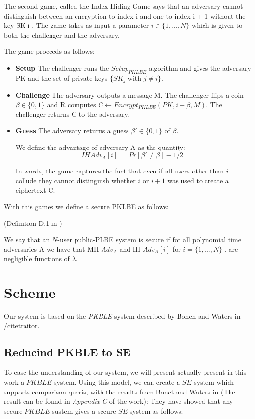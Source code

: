 \documentclass[a4paper, 12pt, oneside]{article}
\begin{document}
 The second game, called the Index Hiding Game says that an adversary cannot distinguish between an encryption to index i and one to index i + 1 without the key SK i . The game takes as input a parameter $i \in \{1, . . . , N\}$ which is given to both the challenger and the adversary.
 
The game proceeds as follows:
\begin{itemize}

\item \textbf{Setup} The challenger runs the $Setup_{PKLBE}$ algorithm and gives the adversary PK and the set of private keys $\{SK_j$ with $j \neq i\}$.


\item \textbf{Challenge} The adversary outputs a message M. The challenger flips a coin 
$\beta \in \{0, 1\}$ and R
computes $C \leftarrow Encrypt_{PKLBE}(PK, i + \beta, M)$. The challenger returns C to the adversary.

\item \textbf{Guess} The adversary returns a guess $\beta' \in \{0, 1\}$ of $\beta$.


We define the advantage of adversary A as the quantity:
\[IH Adv_A[i] = \vert Pr[\beta' \neq \beta] - 1/2 \vert\]

In words, the game captures the fact that even if all users other than $i$ collude they cannot distinguish whether $i$ or $i + 1$ was used to create a ciphertext C.

\end{itemize}
With this games we define a secure PKLBE as follows:

(Definition D.1 in \cite{bowa}) 

We say that an $N$-user public-PLBE system is secure if for all polynomial time
adversaries A we have that MH $Adv_A$ and IH $Adv_A [i]$ for $i = \{1, . . . , N\}$ , are negligible functions of $\lambda$.


\newpage
\section{Scheme}

Our system is based on the \textit{PKBLE} system described by Boneh and Waters in /cite{traitor}. 

\subsection{Reducind PKBLE to SE}

To ease the understanding of our system, we will present actually present in this work a $PKBLE$-system. Using this model, we can create a $SE$-system which supports comparison queris, with the results from Bonet and Waters in \cite{bowa} (The result can be found in \textit{Appendix C} of the work): They have showed that any secure $PKBLE$-sustem gives a secure $SE$-system as follows:
\end{document}
